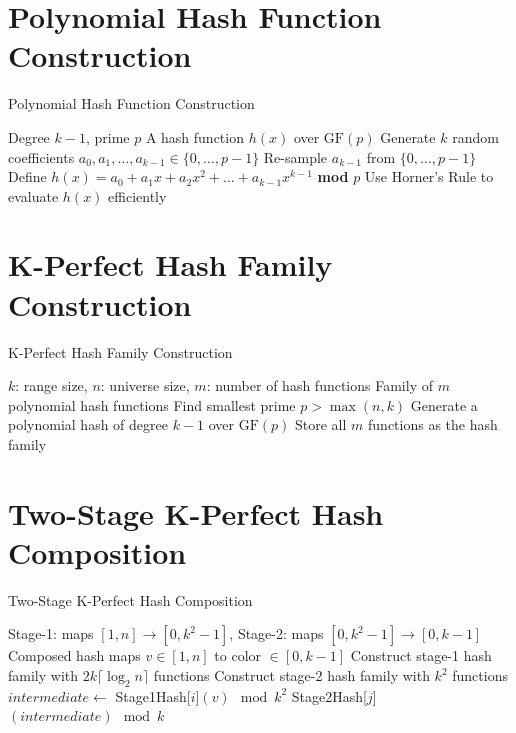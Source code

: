\documentclass{article}
\begin{document}
\section{Polynomial Hash Function Construction}
\begin{algorithm}[H]
    \caption{Polynomial Hash Function Construction}
    \begin{algorithmic}[1]
        \Require Degree $k - 1$, prime $p$
        \Ensure A hash function $h(x)$ over $\text{GF}(p)$
        \State Generate $k$ random coefficients $a_0, a_1, \ldots, a_{k-1} \in \{0, \ldots, p - 1\}$
        \State Re-sample $a_{k-1}$ from $\{0, \ldots, p - 1\}$
        \EndWhile
        \State Define $h(x) = a_0 + a_1 x + a_2 x^2 + \ldots + a_{k-1}x^{k-1}$ \textbf{mod} $p$
        \State Use Horner's Rule to evaluate $h(x)$ efficiently
    \end{algorithmic}
\end{algorithm}

\section{K-Perfect Hash Family Construction}
\begin{algorithm}[H]
    \caption{K-Perfect Hash Family Construction}
    \begin{algorithmic}[1]
        \Require $k$: range size, $n$: universe size, $m$: number of hash functions
        \Ensure Family of $m$ polynomial hash functions
        \State Find smallest prime $p > \max(n, k)$
        \State Generate a polynomial hash of degree $k - 1$ over $\text{GF}(p)$
        \EndFor
        \State Store all $m$ functions as the hash family
    \end{algorithmic}
\end{algorithm}

\section{Two-Stage K-Perfect Hash Composition}
\begin{algorithm}[H]
    \caption{Two-Stage K-Perfect Hash Composition}
    \begin{algorithmic}[1]
        \Require Stage-1: maps $[1,n] \rightarrow [0,k^2{-}1]$, Stage-2: maps $[0,k^2{-}1] \rightarrow [0,k{-}1]$
        \Ensure Composed hash maps $v \in [1,n]$ to color $\in [0,k{-}1]$
        \State Construct stage-1 hash family with $2k\lceil \log_2 n \rceil$ functions
        \State Construct stage-2 hash family with $k^2$ functions
        \State $intermediate \gets$ Stage1Hash[$i$]$(v) \mod k^2$
        \State \Return Stage2Hash[$j$]$(intermediate) \mod k$
        \EndFunction
    \end{algorithmic}
\end{algorithm}
\end{document}
